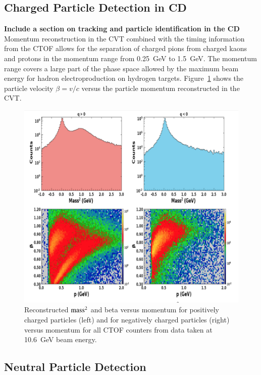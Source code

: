 \documentclass[final,3p,twocolumn]{elsarticle}
\begin{document}
\subsection{Charged Particle Detection in CD} 

{\bf Include a section on tracking and particle identification in the CD}
Momentum reconstruction in the CVT combined with the timing information from the CTOF allows for the separation 
of charged pions from charged kaons and protons in the momentum range from 0.25~GeV to 1.5~GeV. The momentum
range covers a large part of the phase space allowed by the maximum beam energy for hadron electroproduction 
on hydrogen targets. Figure~\ref{CD-PID} shows the particle velocity $\beta = v/c$ versus the particle momentum 
reconstructed in the CVT.

\begin{figure}[htbp!]
\centerline{\includegraphics[width=1.0\columnwidth]{CTOF-PID.png}}
\caption{Reconstructed $\rm mass^2$ and beta versus momentum for positively charged particles (left) and for
negatively charged particles (right) versus momentum for all CTOF counters from data taken at 10.6~GeV beam energy.}
\label{CD-PID}
\end{figure} 

\subsection{Neutral Particle Detection} 
\end{document}
